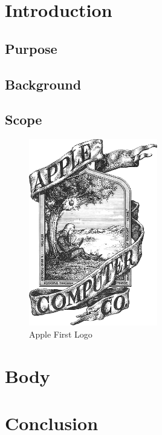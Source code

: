 \documentclass[12pt,a4paper]{report}
\begin{document}
\thispagestyle{empty}
\renewcommand\contentsname{Table of Contents}\tableofcontents
\listoffigures
\pagebreak

\pagestyle{fancy}
\cfoot{\thepage}
\renewcommand{\headrulewidth}{0.4pt}
\renewcommand{\footrulewidth}{0.4pt}


\section{Introduction}

\subsection{Purpose}

\subsection{Background}

\subsection{Scope}

	\begin{figure}[h!]
		\centering
		\includegraphics[width=0.5\textwidth]{Apple_first_logo.png}
		\caption{Apple First Logo}
	\end{figure}
	
\section{Body}

\section{Conclusion}
\end{document}
